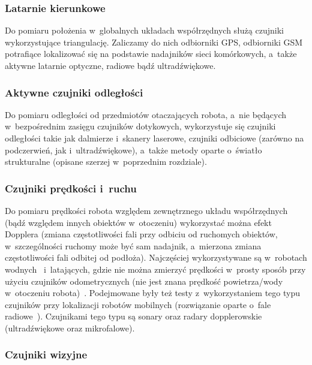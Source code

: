 \subsubsection{Latarnie kierunkowe}

Do pomiaru położenia w~globalnych układach współrzędnych służą czujniki
wykorzystujące triangulację. Zaliczamy do nich odbiorniki GPS, odbiorniki GSM
potrafiące lokalizować się na podstawie nadajników sieci komórkowych, a~także
aktywne latarnie optyczne, radiowe bądź ultradźwiękowe.

\subsubsection{Aktywne czujniki odległości}

Do pomiaru odległości od przedmiotów otaczających robota, a~nie będących
w~bezpośrednim zasięgu czujników dotykowych, wykorzystuje się czujniki odległości
takie jak dalmierze i~skanery laserowe, czujniki odbiciowe (zarówno na podczerwień,
jak i~ultradźwiękowe), a~także metody oparte o~światło strukturalne (opisane szerzej
w~poprzednim rozdziale).

\subsubsection{Czujniki prędkości i~ruchu}

Do pomiaru prędkości robota względem zewnętrznego układu współrzędnych (bądź
względem innych obiektów w~otoczeniu) wykorzystać można efekt Dopplera (zmiana
częstotliwości fali przy odbiciu od ruchomych obiektów, w~szczególności ruchomy
może być sam nadajnik, a~mierzona zmiana częstotliwości fali odbitej od podłoża).
Najczęściej wykorzystywane są w~robotach wodnych~\cite{doppler_underwater} i~latających, gdzie nie
można zmierzyć prędkości w~prosty sposób przy użyciu czujników odometrycznych
(nie jest znana prędkość powietrza/wody w~otoczeniu robota)~\cite{whereami}.
Podejmowane były też testy z~wykorzystaniem tego typu czujników przy lokalizacji
robotów mobilnych (rozwiązanie oparte o~fale radiowe~\cite{doppler_mobilesensor}).
Czujnikami tego typu są sonary oraz radary dopplerowskie (ultradźwiękowe
oraz mikrofalowe).

\subsubsection{Czujniki wizyjne}

